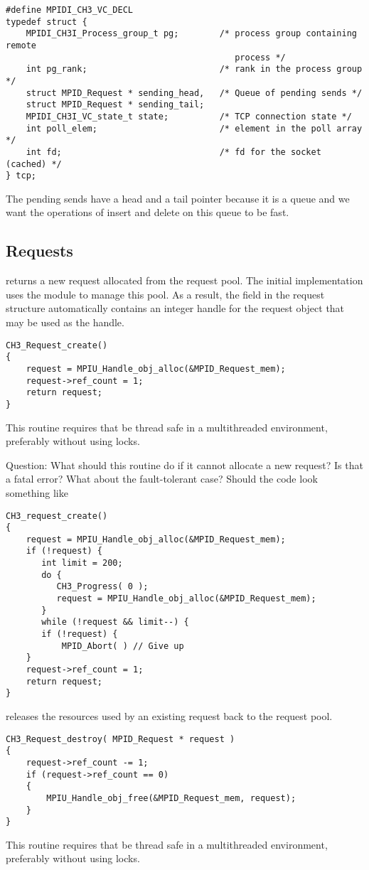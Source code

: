 \documentclass{article}
\begin{document}
\begin{verbatim}
#define MPIDI_CH3_VC_DECL
typedef struct {
    MPIDI_CH3I_Process_group_t pg;        /* process group containing remote
                                             process */
    int pg_rank;                          /* rank in the process group */
    struct MPID_Request * sending_head,   /* Queue of pending sends */
    struct MPID_Request * sending_tail;
    MPIDI_CH3I_VC_state_t state;          /* TCP connection state */
    int poll_elem;                        /* element in the poll array */
    int fd;                               /* fd for the socket (cached) */
} tcp;
\end{verbatim}
The pending sends have a head and a tail pointer because it is a queue and we
want the operations of insert and delete on this queue to be fast.

\subsection{Requests}
 returns a new request allocated from the
request pool.  The initial implementation uses the 
module to manage this pool.  As a result, the  field in the
request structure automatically contains an integer handle for the
request object that may be used as the  handle.
\begin{verbatim}
CH3_Request_create() 
{
    request = MPIU_Handle_obj_alloc(&MPID_Request_mem);
    request->ref_count = 1;
    return request;
}
\end{verbatim}
This routine requires that  be thread safe in a
multithreaded environment, preferably without using locks.

Question: What should this routine do if it cannot allocate a new
request?  Is that a fatal error?  What about the fault-tolerant case?
Should the code look something like
\begin{verbatim}
CH3_request_create()
{
    request = MPIU_Handle_obj_alloc(&MPID_Request_mem);
    if (!request) {
       int limit = 200;
       do { 
          CH3_Progress( 0 );
          request = MPIU_Handle_obj_alloc(&MPID_Request_mem);
       }
       while (!request && limit--) {
       if (!request) { 
           MPID_Abort( ) // Give up
    }
    request->ref_count = 1;
    return request;
}    
\end{verbatim}

 releases the resources used by an existing request
back to the request pool.  
\begin{verbatim}
CH3_Request_destroy( MPID_Request * request ) 
{
    request->ref_count -= 1;
    if (request->ref_count == 0)
    { 
        MPIU_Handle_obj_free(&MPID_Request_mem, request);
    }
}
\end{verbatim}
This routine requires that  be thread safe in a
multithreaded environment, preferably without using locks.
\end{document}
